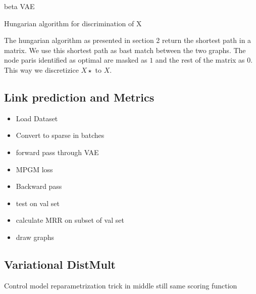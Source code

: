 beta VAE

Hungarian algorithm for discrimination of X


The hungarian algorithm as presented in section 2 return the shortest path in a matrix. We use this shortest path as bast match between the two graphs. The node paris identified as optimal are masked as $1$ and the rest of the matrix as $0$. This way we discretizice $X\star$ to $X$. 


\subsection{Link prediction and Metrics}




\begin{itemize}
    \item Load Dataset
    \item Convert to sparse in batches
    \item forward pass through VAE
    \item MPGM loss
    \item Backward pass
    \item test on val set
    \item calculate MRR on subset of val set
    \item draw graphs
\end{itemize}


\subsection{Variational DistMult}

Control model
reparametrization trick in middle
still same scoring function

